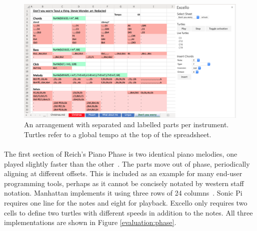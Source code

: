 \begin{figure}[tbh]
\centerline{\includegraphics[width=150mm]{figs/excelloFranzRedacted.png}}
\caption{An arrangement with separated and labelled parts per instrument. Turtles refer to a global tempo at the top of the spreadsheet.}
\label{evaluation:excelloFranzRedacted}
\end{figure}

\paragraph{} The first section of Reich's Piano Phase is two identical piano melodies, one played slightly faster than the other~\cite{epstein:pianoPhase}. The parts move out of phase, periodically aligning at different offsets. This is included as an example for many end-user programming tools, perhaps as it cannot be concisely notated by western staff notation. Manhattan implements it using three rows of 24 columns~\cite{nash:manhattan}. Sonic Pi requires one line for the notes and eight for playback. Excello only requires two cells to define two turtles with different speeds in addition to the notes. All three implementations are shown in Figure \ref{evaluation:phase}.

